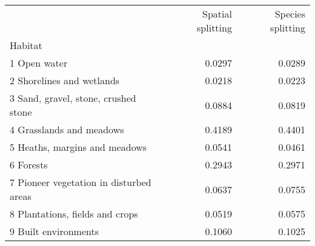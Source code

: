 \begin{tabular}{lrr}
\toprule
{} &  Spatial splitting &  Species splitting \\
Habitat                                 &                    &                    \\
\midrule
1 Open water                            &             0.0297 &             0.0289 \\
2 Shorelines and wetlands               &             0.0218 &             0.0223 \\
3 Sand, gravel, stone, crushed stone    &             0.0884 &             0.0819 \\
4 Grasslands and meadows                &             0.4189 &             0.4401 \\
5 Heaths, margins and meadows           &             0.0541 &             0.0461 \\
6 Forests                               &             0.2943 &             0.2971 \\
7 Pioneer vegetation in disturbed areas &             0.0637 &             0.0755 \\
8 Plantations, fields and crops         &             0.0519 &             0.0575 \\
9 Built environments                    &             0.1060 &             0.1025 \\
\bottomrule
\end{tabular}
